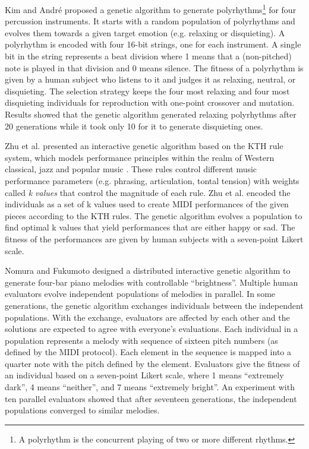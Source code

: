Kim and Andr{\'e} \cite{kim2004composing} proposed a genetic algorithm to generate polyrhythms\footnote{A polyrhythm is the concurrent playing of two or more different rhythms.} for four percussion instruments. It starts with a random population of polyrhythms and evolves them towards a given target emotion (e.g. relaxing or disquieting). A polyrhythm is encoded with four 16-bit strings, one for each instrument. A single bit in the string represents a beat division where 1 means that a (non-pitched) note is played in that division and 0 means silence. The fitness of a polyrhythm is given by a human subject who listens to it and judges it as relaxing, neutral, or disquieting. The selection strategy keeps the four most relaxing and four most disquieting individuals for reproduction with one-point crossover and mutation. Results showed that the genetic algorithm generated relaxing polyrhythms after 20 generations while it took only
10 for it to generate disquieting ones.

Zhu et al. \cite{zhu2008emotional} presented an interactive genetic algorithm based on the KTH rule system, which models performance principles within the realm of Western classical, jazz and popular music \cite{}. These rules control different music performance parameters (e.g. phrasing, articulation, tontal tension) with weights called \textit{k values} that control the magnitude of each rule. Zhu et al. \cite{zhu2008emotional} encoded the individuals as a set of k values used to create MIDI performances of the given pieces according to the KTH rules. The genetic algorithm evolves a population to find optimal k values that yield performances that are either happy or sad. The fitness of the performances are given by human subjects with a seven-point Likert scale.

Nomura and Fukumoto \cite{nomura2018music} designed a distributed interactive genetic algorithm to generate four-bar piano melodies with controllable ``brightness''. Multiple human evaluators evolve independent populations of melodies in parallel. In some generations, the genetic algorithm exchanges individuals between the independent populations. With the exchange, evaluators are affected by each other and the solutions are expected to agree with everyone's evaluations. Each individual in a population represents a melody with sequence of sixteen pitch numbers (as defined by the MIDI protocol). Each element in the sequence is mapped into a quarter note with the pitch defined by the element. Evaluators give the fitness of an individual based on a seven-point Likert scale, where 1 means ``extremely dark'', 4 means ``neither'', and 7 means ``extremely bright''. An experiment with ten parallel evaluators showed that after seventeen generations, the independent populations converged to similar melodies.


